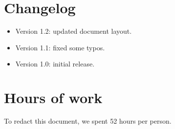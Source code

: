  \begin{appendices}

\chapter{Changelog}
\begin{itemize}
	\item Version 1.2: updated document layout.
	\item Version 1.1: fixed some typos.
	\item Version 1.0: initial release.
\end{itemize}

\chapter{Hours of work}
To redact this document, we spent 52 hours per person.



\end{appendices}
